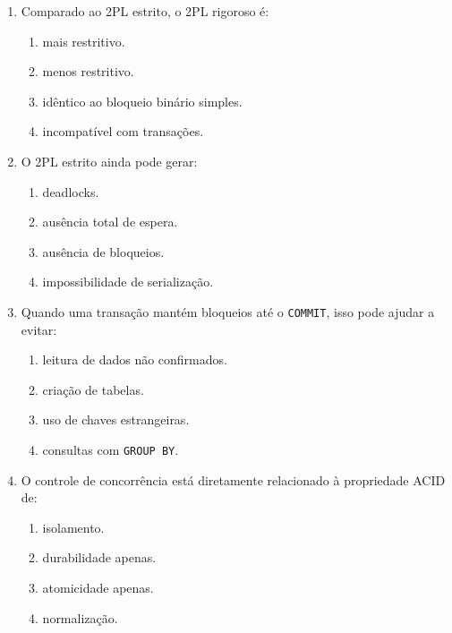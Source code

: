 \documentclass[12pt,a4paper]{article}
\begin{document}
\begin{enumerate}[label=\textbf{Q\arabic*.}]
\begin{enumerate}[label=\alph*)]
    \item o fim da transação.
    \item a primeira operação de leitura.
    \item antes da primeira escrita.
    \item o início da transação.
\end{enumerate}

\item Comparado ao 2PL estrito, o 2PL rigoroso é:

\begin{enumerate}[label=\alph*)]
    \item mais restritivo.
    \item menos restritivo.
    \item idêntico ao bloqueio binário simples.
    \item incompatível com transações.
\end{enumerate}

\item O 2PL estrito ainda pode gerar:

\begin{enumerate}[label=\alph*)]
    \item deadlocks.
    \item ausência total de espera.
    \item ausência de bloqueios.
    \item impossibilidade de serialização.
\end{enumerate}

\item Quando uma transação mantém bloqueios até o \texttt{COMMIT}, isso pode ajudar a evitar:

\begin{enumerate}[label=\alph*)]
    \item leitura de dados não confirmados.
    \item criação de tabelas.
    \item uso de chaves estrangeiras.
    \item consultas com \texttt{GROUP BY}.
\end{enumerate}

\item O controle de concorrência está diretamente relacionado à propriedade ACID de:

\begin{enumerate}[label=\alph*)]
    \item isolamento.
    \item durabilidade apenas.
    \item atomicidade apenas.
    \item normalização.
\end{enumerate}


\end{enumerate}
\end{document}
